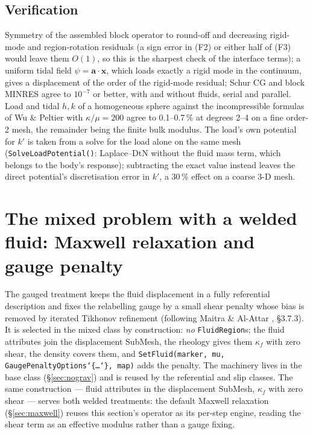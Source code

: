 \documentclass[11pt]{article}
\numberwithin{equation}{section}
\theoremstyle{remark}
\newcommand{\vx}{\mathbf{x}}
\newcommand{\code}[1]{\texttt{#1}}
\begin{document}
\subsection{Verification}

Symmetry of the assembled block operator to round-off and decreasing
rigid-mode and region-rotation residuals (a sign error in (F2) or either
half of (F3) would leave them $O(1)$, so this is the sharpest check of the
interface terms); a uniform tidal field $\psi = \mathbf{a}\cdot\vx$, which
loads exactly a rigid mode in the continuum, gives a displacement of the
order of the rigid-mode residual; Schur CG and block MINRES agree to
$10^{-7}$ or better, with and without fluids, serial and parallel. Load
and tidal $h, k$ of a homogeneous sphere against the incompressible
formulas of Wu \& Peltier \cite{WuPeltier1982} with $\kappa/\mu = 200$
agree to 0.1--0.7\,\% at degrees 2--4 on a fine order-2 mesh, the
remainder being the finite bulk modulus. The load's own potential for
$k'$ is taken from a solve for the load alone on the same mesh
(\code{SolveLoadPotential()}: Laplace--DtN without the fluid mass term,
which belongs to the body's response); subtracting the exact value instead
leaves the direct potential's discretisation error in $k'$, a 30\,\% effect
on a coarse 3-D mesh.

\section{The mixed problem with a welded fluid: Maxwell relaxation and gauge penalty}
\label{sec:gauged}

The gauged treatment keeps the fluid displacement in a fully referential
description and fixes the relabelling gauge by a small shear penalty whose
bias is removed by iterated Tikhonov refinement (following Maitra \&
Al-Attar \cite{MaitraAlAttar2024}, \S3.7.3). It is selected in the mixed
class by construction: \emph{no} \code{FluidRegion}s; the fluid attributes
join the displacement SubMesh, the rheology gives them $\kappa_f$ with zero
shear, the density covers them, and \code{SetFluid(marker, mu, GaugePenaltyOptions\char`\{\ldots\char`\}, map)} adds the
penalty. The machinery lives in the base class
(\S\ref{sec:nograv}) and is reused by the referential and slip classes.
The same construction --- fluid attributes in the displacement SubMesh,
$\kappa_f$ with zero shear --- serves both welded treatments: the default
Maxwell relaxation (\S\ref{sec:maxwell}) reuses this section's operator
as its per-step engine, reading the shear term as an effective modulus
rather than a gauge fixing.
\end{document}
